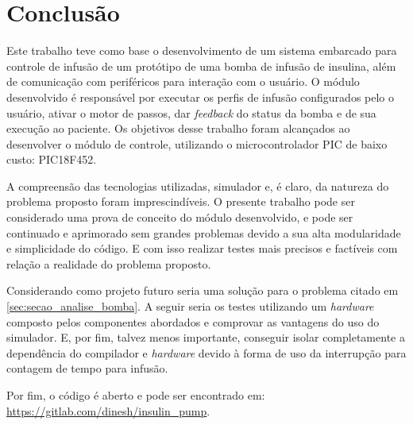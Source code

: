 \chapter{Conclusão}

Este trabalho teve como base o desenvolvimento de um sistema embarcado para controle de infusão de um protótipo de uma bomba de infusão de insulina, além de comunicação com periféricos para interação com o usuário. O módulo desenvolvido é responsável por executar os perfis de infusão configurados pelo o usuário, ativar o motor de passos, dar \emph{feedback} do status da bomba e de sua execução ao paciente. Os objetivos desse trabalho foram alcançados ao desenvolver o módulo de controle, utilizando o microcontrolador PIC de baixo custo: PIC18F452. 

A compreensão das tecnologias utilizadas, simulador e, é claro, da natureza do problema proposto foram imprescindíveis. O presente trabalho pode ser considerado uma prova de conceito do módulo desenvolvido, e pode ser continuado e aprimorado sem grandes problemas devido a sua alta modularidade e simplicidade do código. E com isso realizar testes mais precisos e factíveis com relação a realidade do problema proposto. 

Considerando como projeto futuro seria uma solução para o problema citado em \ref{sec:secao_analise_bomba}. A seguir seria os testes utilizando um \emph{hardware} composto pelos componentes abordados e comprovar as vantagens do uso do simulador. E, por fim, talvez menos importante, conseguir isolar completamente a dependência do compilador e \emph{hardware} devido à forma de uso da interrupção para contagem de tempo para infusão.

Por fim, o código é aberto e pode ser encontrado em: \url{https://gitlab.com/dinesh/insulin_pump}.